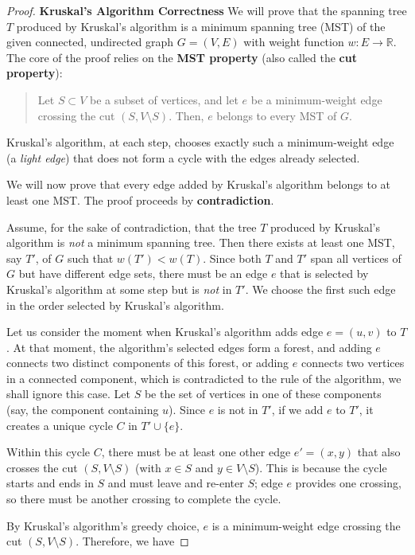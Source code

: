 \begin{proof}
\textbf{Kruskal's Algorithm Correctness}
We will prove that the spanning tree $T$ produced by Kruskal's algorithm is a minimum spanning tree (MST) of the given connected, undirected graph $G=(V,E)$ with weight function $w: E \rightarrow \mathbb{R}$.
The core of the proof relies on the \textbf{MST property} (also called the \textbf{cut property}):
\begin{quote}
Let $S \subset V$ be a subset of vertices, and let $e$ be a minimum-weight edge crossing the cut $(S, V \setminus S)$. Then, $e$ belongs to every MST of $G$.
\end{quote}
Kruskal's algorithm, at each step, chooses exactly such a minimum-weight edge (a \emph{light edge}) that does not form a cycle with the edges already selected.

We will now prove that every edge added by Kruskal's algorithm belongs to at least one MST. The proof proceeds by \textbf{contradiction}.

Assume, for the sake of contradiction, that the tree $T$ produced by Kruskal's algorithm is \emph{not} a minimum spanning tree. Then there exists at least one MST, say $T'$, of $G$ such that $w(T') < w(T)$. Since both $T$ and $T'$ span all vertices of $G$ but have different edge sets, there must be an edge $e$ that is selected by Kruskal's algorithm at some step but is \emph{not} in $T'$. We choose the first such edge in the order selected by Kruskal's algorithm.

Let us consider the moment when Kruskal's algorithm adds edge $e = (u,v)$ to $T$. At that moment, the algorithm's selected edges form a forest, and adding $e$ connects two distinct components of this forest, or adding $e$ connects two vertices in a connected component, which is contradicted to the rule of the algorithm, we shall ignore this case. Let $S$ be the set of vertices in one of these components (say, the component containing $u$). Since $e$ is not in $T'$, if we add $e$ to $T'$, it creates a unique cycle $C$ in $T' \cup \{e\}$.

Within this cycle $C$, there must be at least one other edge $e' = (x,y)$ that also crosses the cut $(S, V \setminus S)$ (with $x \in S$ and $y \in V \setminus S$). This is because the cycle starts and ends in $S$ and must leave and re-enter $S$; edge $e$ provides one crossing, so there must be another crossing to complete the cycle.

By Kruskal's algorithm's greedy choice, $e$ is a minimum-weight edge crossing the cut $(S, V \setminus S)$. Therefore, we have


\end{proof}
